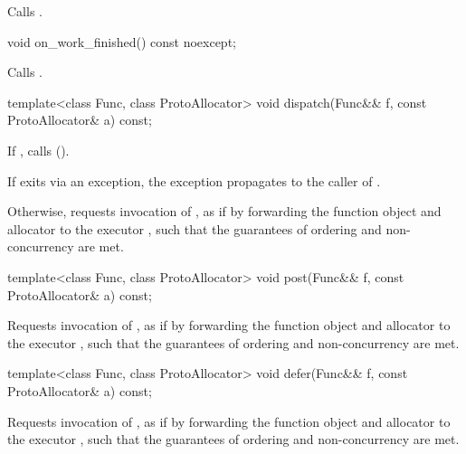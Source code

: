 \begin{itemdescr}
\pnum
\effects Calls .
\end{itemdescr}

\begin{itemdecl}
void on_work_finished() const noexcept;
\end{itemdecl}

\begin{itemdescr}
\pnum
\effects Calls .
\end{itemdescr}

\begin{itemdecl}
template<class Func, class ProtoAllocator>
  void dispatch(Func&& f, const ProtoAllocator& a) const;
\end{itemdecl}

\begin{itemdescr}
\pnum
\effects If , calls  (). \begin{note} If  exits via an exception, the exception propagates to the caller of . \end{note} Otherwise, requests invocation of , as if by forwarding the function object  and allocator  to the executor , such that the guarantees of ordering and non-concurrency are met.
\end{itemdescr}

\begin{itemdecl}
template<class Func, class ProtoAllocator>
  void post(Func&& f, const ProtoAllocator& a) const;
\end{itemdecl}

\begin{itemdescr}
\pnum
\effects Requests invocation of , as if by forwarding the function object  and allocator  to the executor , such that the guarantees of ordering and non-concurrency are met.
\end{itemdescr}

\begin{itemdecl}
template<class Func, class ProtoAllocator>
  void defer(Func&& f, const ProtoAllocator& a) const;
\end{itemdecl}

\begin{itemdescr}
\pnum
\effects Requests invocation of , as if by forwarding the function object  and allocator  to the executor , such that the guarantees of ordering and non-concurrency are met.
\end{itemdescr}



